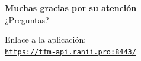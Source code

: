 \documentclass[aspectratio=169,xcolor=dvipsnames]{beamer}
\begin{document}
	\begin{frame}
	    \begin{center}
	        \vspace{30px}
	        \Large \textbf{Muchas gracias por su atención} \\
	        \vspace{30px}
	        \large ¿Preguntas? \\
	        \vspace{60px}
	        
	        Enlace a la aplicación: \\
	        \href{https://tfm-api.ranii.pro:8443/docs}{\texttt{https://tfm-api.ranii.pro:8443/}}
	    \end{center}
	\end{frame}
	
\end{document}
